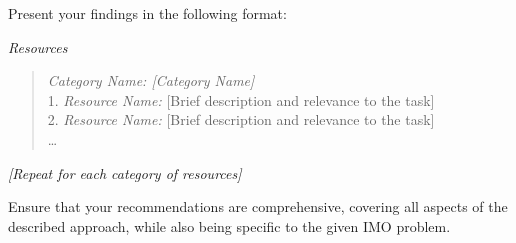 {\begin{tcolorbox}
Present your findings in the following format:

\textit{Resources}
\begin{quote}
\textit{Category Name: [Category Name]}\\
1. \textit{Resource Name:} [Brief description and relevance to the task]\\
2. \textit{Resource Name:} [Brief description and relevance to the task]\\
\ldots
\end{quote}
\textit{[Repeat for each category of resources]}

Ensure that your recommendations are comprehensive, covering all aspects of the described approach, while also being specific to the given IMO problem.

\end{tcolorbox}
}






